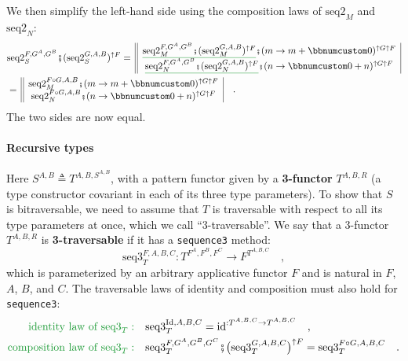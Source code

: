 We then simplify the left-hand side using the composition laws of
$\text{seq2}_{M}$ and $\text{seq2}_{N}$:
\begin{align*}
 & \text{seq2}_{S}^{F,G^{A},G^{B}}\bef(\text{seq2}_{S}^{G,A,B})^{\uparrow F}=\,\begin{array}{||c|}
\gunderline{\text{seq2}_{M}^{F,G^{A},G^{B}}\bef(\text{seq2}_{M}^{G,A,B})^{\uparrow F}}\bef(m\rightarrow m+\bbnum 0)^{\uparrow G\uparrow F}\\
\gunderline{\text{seq2}_{N}^{F,G^{A},G^{B}}\bef(\text{seq2}_{N}^{G,A,B})^{\uparrow F}}\bef(n\rightarrow\bbnum 0+n)^{\uparrow G\uparrow F}
\end{array}\\
 & =\,\begin{array}{||c|}
\text{seq2}_{M}^{F\circ G,A,B}\bef(m\rightarrow m+\bbnum 0)^{\uparrow G\uparrow F}\\
\text{seq2}_{N}^{F\circ G,A,B}\bef(n\rightarrow\bbnum 0+n)^{\uparrow G\uparrow F}
\end{array}\quad.
\end{align*}
The two sides are now equal.

\paragraph{Recursive types}

Here $S^{A,B}\triangleq T^{A,B,S^{A,B}}$, with a pattern functor
given by a \textbf{3-functor} $T^{A,B,R}$ (a
type constructor covariant in each of its three type parameters).
To show that $S$ is bitraversable, we need to assume that $T$ is
traversable with respect to all its type parameters at once, which
we call \textsf{``}3-traversable\textsf{''}. We say that a 3-functor $T^{A,B,R}$
is \textbf{3-traversable} if it
has a \lstinline!sequence3! method:
\[
\text{seq3}_{T}^{F,A,B,C}:T^{F^{A},F^{B},F^{C}}\rightarrow F^{T^{A,B,C}}\quad,
\]
which is parameterized by an arbitrary applicative functor $F$ and
is natural in $F$, $A$, $B$, and $C$. The traversable laws of
identity
and composition
must also hold for \lstinline!sequence3!:
\begin{align}
{\color{greenunder}\text{identity law of }\text{seq3}_{T}:}\quad & \text{seq3}_{T}^{\text{Id},A,B,C}=\text{id}^{:T^{A,B,C}\rightarrow T^{A,B,C}}\quad,\label{eq:identity-law-of-trisequence}\\
{\color{greenunder}\text{composition law of }\text{seq3}_{T}:}\quad & \text{seq3}_{T}^{F,G^{A},G^{B},G^{C}}\bef\big(\text{seq3}_{T}^{G,A,B,C}\big)^{\uparrow F}=\text{seq3}_{T}^{F\circ G,A,B,C}\quad.\label{eq:composition-law-of-trisequence}
\end{align}

